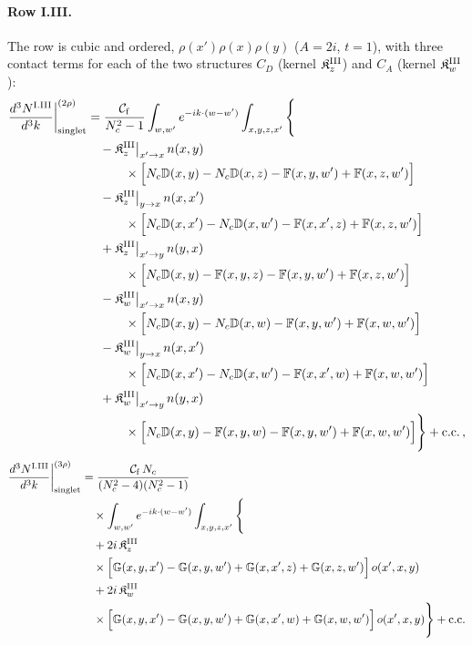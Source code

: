 \paragraph{Row I.III.} The row is cubic and ordered, $\rho(x')\rho(x)\rho(y)$ ($A=2i$, $t=1$), with three contact terms for each of the two structures $C_D$ (kernel $\mathfrak K^{\rm III}_z$) and $C_A$ (kernel $\mathfrak K^{\rm III}_w$):
\begin{align}\label{eq:sIIII}
\frac{d^3N^{\rm I.III}}{d^3k}\bigg|^{(2\rho)}_{\rm singlet}&=\frac{\mathcal C_{\rm f}}{N_c^2-1}\int_{w,w'}e^{-ik\cdot(w-w')}\int_{x,y,z,x'}\Bigg\{\notag\\
&\quad-\mathfrak K^{\rm III}_z\big|_{x'\to x}\,n(x,y)\notag\\
&\qquad\quad\times\Big[N_c\mathbb{D}(x,y)-N_c\mathbb{D}(x,z)-\mathbb{F}(x,y,w')+\mathbb{F}(x,z,w')\Big]\notag\\
&\quad-\mathfrak K^{\rm III}_z\big|_{y\to x}\,n(x,x')\notag\\
&\qquad\quad\times\Big[N_c\mathbb{D}(x,x')-N_c\mathbb{D}(x,w')-\mathbb{F}(x,x',z)+\mathbb{F}(x,z,w')\Big]\notag\\
&\quad+\mathfrak K^{\rm III}_z\big|_{x'\to y}\,n(y,x)\notag\\
&\qquad\quad\times\Big[N_c\mathbb{D}(x,y)-\mathbb{F}(x,y,z)-\mathbb{F}(x,y,w')+\mathbb{F}(x,z,w')\Big]\notag\\
&\quad-\mathfrak K^{\rm III}_w\big|_{x'\to x}\,n(x,y)\notag\\
&\qquad\quad\times\Big[N_c\mathbb{D}(x,y)-N_c\mathbb{D}(x,w)-\mathbb{F}(x,y,w')+\mathbb{F}(x,w,w')\Big]\notag\\
&\quad-\mathfrak K^{\rm III}_w\big|_{y\to x}\,n(x,x')\notag\\
&\qquad\quad\times\Big[N_c\mathbb{D}(x,x')-N_c\mathbb{D}(x,w')-\mathbb{F}(x,x',w)+\mathbb{F}(x,w,w')\Big]\notag\\
&\quad+\mathfrak K^{\rm III}_w\big|_{x'\to y}\,n(y,x)\notag\\
&\qquad\quad\times\Big[N_c\mathbb{D}(x,y)-\mathbb{F}(x,y,w)-\mathbb{F}(x,y,w')+\mathbb{F}(x,w,w')\Big]\Bigg\}+{\rm c.c.}\,,
\end{align}
\begin{align}\label{eq:oIIII}
\frac{d^3N^{\rm I.III}}{d^3k}\bigg|^{(3\rho)}_{\rm singlet}&=\frac{\mathcal C_{\rm f}\,N_c}{(N_c^2-4)(N_c^2-1)}\notag\\
&\quad\times\int_{w,w'}e^{-ik\cdot(w-w')}\int_{x,y,z,x'}\Bigg\{\notag\\
&\quad+2i\,\mathfrak K^{\rm III}_z\notag\\
&\quad\times\Big[\mathbb{G}(x,y,x')-\mathbb{G}(x,y,w')+\mathbb{G}(x,x',z)+\mathbb{G}(x,z,w')\Big]\,o(x',x,y)\notag\\
&\quad+2i\,\mathfrak K^{\rm III}_w\notag\\
&\quad\times\Big[\mathbb{G}(x,y,x')-\mathbb{G}(x,y,w')+\mathbb{G}(x,x',w)+\mathbb{G}(x,w,w')\Big]\,o(x',x,y)\Bigg\}+{\rm c.c.}
\end{align}

